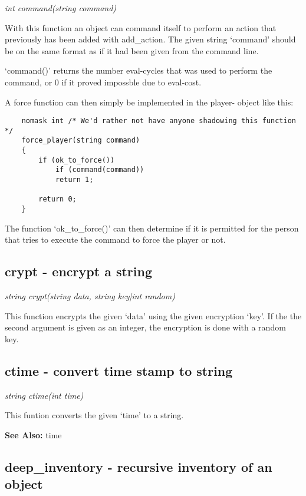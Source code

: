     {\em int command(string command)}

    With this function an object can command itself to perform
    an action that previously has been added with add\_action.
    The given string `command' should be on the same format as
    if it had been given from the command line.

    `command()' returns the number eval-cycles that was used to perform
    the command, or 0 if it proved impossble due to eval-cost.

    A force function can then simply be implemented in the player-
    object like this:

    \begin{verbatim}
    nomask int /* We'd rather not have anyone shadowing this function */
    force_player(string command)
    {
        if (ok_to_force())
            if (command(command))
            return 1;

        return 0;
    }
    \end{verbatim}

    The function `ok\_to\_force()' can then determine if it is permitted
    for the person that tries to execute the command to force the
    player or not.



\subsection{crypt - encrypt a string}

    {\em string crypt(string data, string key|int random)}

    This function encrypts the given `data' using the given encryption
    `key'. If the the second argument is given as an integer, the
    encryption is done with a random key.



\subsection{ctime - convert time stamp to string}

    {\em string ctime(int time)}

    This funtion converts the given `time' to a string.

    {\bf See Also: }    time



\subsection{deep\_inventory - recursive inventory of an object}

